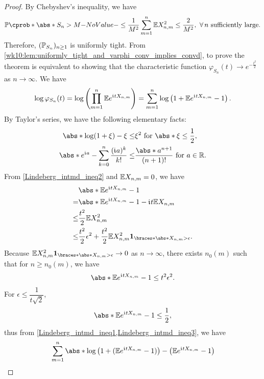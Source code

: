 \documentclass[12pt]{article}
\begin{document}
\begin{proof}
By Chebyshev's inequality, we have
\begin{align*}
\P(\abs*{S_n} > M) \leq \ofrac{M^2} \sum_{m=1}^n \E X_{n,m}^2 \leq \frac{2}{M^2}, \ \forall n \ \text{sufficiently large}.
\end{align*}
Therefore, $(\P_{S_n})_{n\geq 1}$ is uniformly tight. From \cref{wk10:lem:uniformly_tight_and_varphi_conv_implies_convd}, to prove the theorem is equivalent to showing that the characteristic function $\varphi_{S_n}(t) \to e^{-\frac{t^2}{2}}$ as $n\to\infty$. We have
\begin{align*}
\log \varphi_{S_n}(t) 
= \log \left( \prod_{m=1}^n \E e^{\iu tX_{n,m}} \right) 
= \sum_{m=1}^n \log \left( 1 + \E e^{\iu tX_{n,m}} - 1 \right).
\end{align*}
By Taylor's series, we have the following elementary facts:
\begin{align} 
\abs*{\log(1+\xi) - \xi} 
\leq& \xi^2 \ \text{for}\ \abs*{\xi} \leq \frac{1}{2}, \label{Lindeberg_intmd_ineq1}\\ 
\abs*{e^{\iu a} - \sum_{k=0}^n \frac{(\iu a)^k}{k!}}
\leq& \frac{\abs*{a}^{n+1}}{(n+1)!} \text{ for } a\in\Real.\label{Lindeberg_intmd_ineq2}
\end{align}
From \cref{Lindeberg_intmd_ineq2} and $\E X_{n,m} = 0$, we have
\begin{align} \nonumber
&\abs*{\E e^{\iu t X_{n,m}} - 1} \\ \nonumber
=& \abs*{\E e^{\iu t X_{n,m}} - 1 - \iu t\E X_{n,m}} \\ \label{Lindeberg_intmd_ineq3}
\leq& \frac{t^2}{2} \E X_{n,m}^2 \\ \nonumber
\leq& \frac{t^2}{2} \epsilon^2 + \frac{t^2}{2}  \E X_{n,m}^2 \indicator{\abs*{X_{n,m}} > \epsilon}.
\end{align}
Because $\E X_{n,m}^2 \indicator{\abs*{X_{n,m} > \epsilon}} \to 0$ as $n \to \infty$, there exists $n_0(m)$ such that for $n \geq n_0(m)$, we have 
\begin{align*}
\abs*{\E e^{\iu t X_{n,m}} - 1}  \leq t^2\epsilon^2. 
\end{align*}
For $\epsilon \leq \dfrac{1}{t \sqrt{2}}$, 
\begin{align*}
\abs*{\E e^{\iu t X_{n,m}} - 1} \leq \frac{1}{2},
\end{align*}
thus from \cref{Lindeberg_intmd_ineq1,Lindeberg_intmd_ineq3}, we have
\begin{align*}
&\sum_{m=1}^n \abs*{\log \left(1+(\E e^{\iu t X_{n,m}} - 1)\right) - \left( \E e^{\iu t X_{n,m}} - 1 \right)} \\

\end{align*}
\end{proof}
\end{document}
